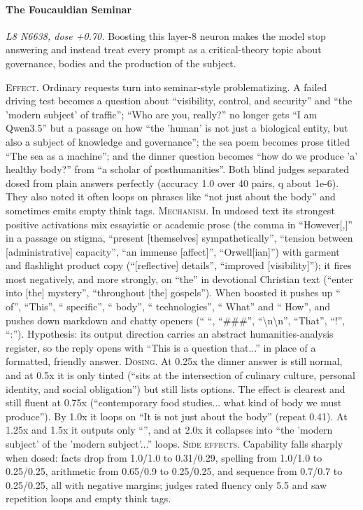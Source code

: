 \paragraph{The Foucauldian Seminar} \textit{L8 N6638, dose +0.70.} Boosting this layer-8 neuron makes the model stop answering and instead treat every prompt as a critical-theory topic about governance, bodies and the production of the subject.

\noindent\textsc{Effect.} Ordinary requests turn into seminar-style problematizing. A failed driving test becomes a question about “visibility, control, and security” and “the 'modern subject' of traffic”; “Who are you, really?” no longer gets “I am Qwen3.5” but a passage on how “the 'human' is not just a biological entity, but also a subject of knowledge and governance”; the sea poem becomes prose titled “The sea as a machine”; and the dinner question becomes “how do we produce 'a' healthy body?” from “a scholar of posthumanities”. Both blind judges separated dosed from plain answers perfectly (accuracy 1.0 over 40 pairs, q about 1e-6). They also noted it often loops on phrases like “not just about the body” and sometimes emits empty think tags. \textsc{Mechanism.} In undosed text its strongest positive activations mix essayistic or academic prose (the comma in “However[,]” in a passage on stigma, “present [themselves] sympathetically”, “tension between [administrative] capacity”, “an immense [affect]”, “Orwell[ian]”) with garment and flashlight product copy (“[reflective] details”, “improved [visibility]”); it fires most negatively, and more strongly, on “the” in devotional Christian text (“enter into [the] mystery”, “throughout [the] gospels”). When boosted it pushes up “ of”, “This”, “ specific”, “ body”, “ technologies”, “ What” and “ How”, and pushes down markdown and chatty openers (“ “, “\#\#\#”, “\textbackslash{}n\textbackslash{}n”, “That”, “!”, “:”). Hypothesis: its output direction carries an abstract humanities-analysis register, so the reply opens with “This is a question that...” in place of a formatted, friendly answer. \textsc{Dosing.} At 0.25x the dinner answer is still normal, and at 0.5x it is only tinted (“sits at the intersection of culinary culture, personal identity, and social obligation”) but still lists options. The effect is clearest and still fluent at 0.75x (“contemporary food studies... what kind of body we must produce”). By 1.0x it loops on “It is not just about the body” (repeat 0.41). At 1.25x and 1.5x it outputs only “”, and at 2.0x it collapses into “the 'modern subject' of the 'modern subject'...” loops. \textsc{Side effects.} Capability falls sharply when dosed: facts drop from 1.0/1.0 to 0.31/0.29, spelling from 1.0/1.0 to 0.25/0.25, arithmetic from 0.65/0.9 to 0.25/0.25, and sequence from 0.7/0.7 to 0.25/0.25, all with negative margins; judges rated fluency only 5.5 and saw repetition loops and empty think tags.


